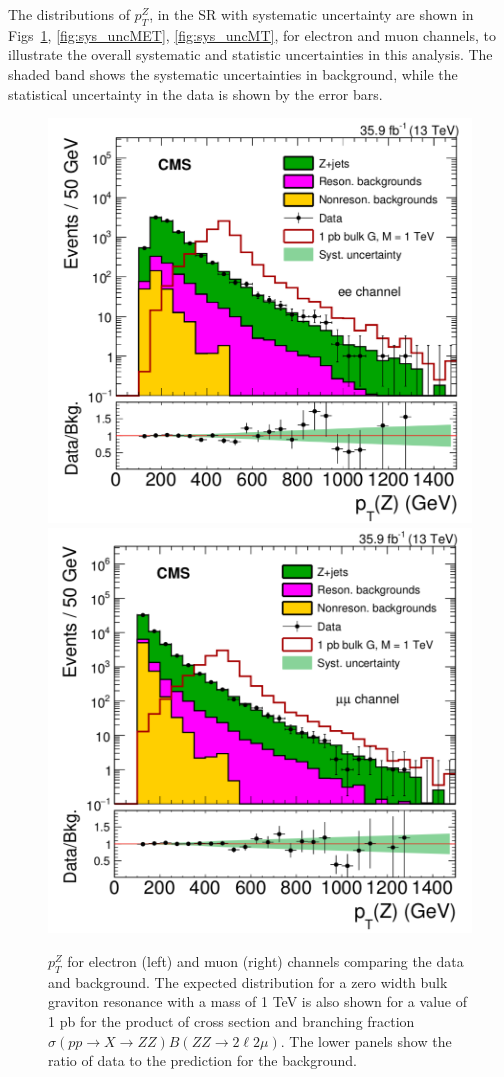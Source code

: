 \vspace{0.3cm}
The distributions of $p_T ^Z$, \ptmiss in the SR with systematic uncertainty are shown in Figs~\ref{fig:sys_uncZpt}, \ref{fig:sys_uncMET}, \ref{fig:sys_uncMT}, for electron and muon channels, to illustrate the overall systematic and statistic uncertainties in this analysis. The shaded band shows the systematic uncertainties in background, while the statistical uncertainty in the data is shown by the error bars.
\begin{figure}[htbp]
\begin{center}
\includegraphics[width=0.49\linewidth]{figures/sys_elSRuncZpt.png}
\includegraphics[width=0.49\linewidth]{figures/sys_muSRuncZpt.png}
\caption{$p_T ^Z$ for electron (left) and muon (right) channels comparing the data and background. The expected distribution for a zero width bulk graviton resonance with a mass of 1 TeV is also shown for a value of 1 pb for the product of cross section and branching fraction $\sigma(pp\rightarrow X\rightarrow ZZ)B(ZZ\rightarrow 2\ell 2\mu)$. The lower panels show the ratio of data to the prediction for the background. }
\label{fig:sys_uncZpt}
\end{center}
\end{figure}

